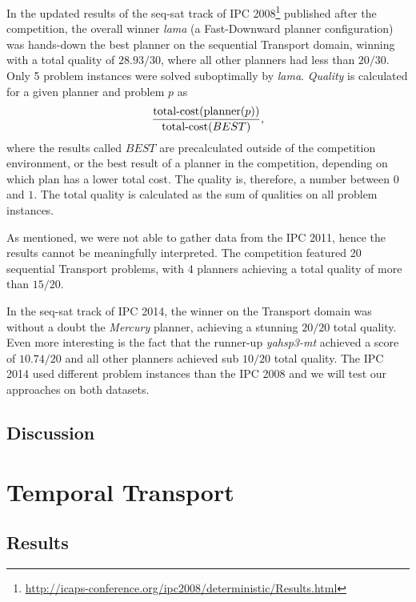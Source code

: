 In the updated results of the seq-sat track of IPC 2008\footnote{\url{http://icaps-conference.org/ipc2008/deterministic/Results.html}} published after the competition,
the overall winner \textit{lama} (a Fast-Downward  planner configuration)
was hands-down the best planner on the sequential Transport domain, winning
with a total quality of $28.93/30$, where all other planners had less than $20/30$.
Only 5 problem instances were solved suboptimally by \textit{lama}.
\textit{Quality} is calculated for a given planner and problem $p$
as $$\frac{\textrm{total-cost}(\textrm{planner}(p))}{\textrm{total-cost}(BEST)},$$ where the results called $BEST$
are precalculated outside of the competition environment, or the best result of a planner in the competition, depending on which plan has a lower total cost. The quality is, therefore, a number between $0$ and $1$. The total quality is calculated as the sum of qualities on all problem instances.

As mentioned, we were not able to gather data from the IPC 2011,
hence the results cannot be meaningfully interpreted.
The competition featured 20 sequential Transport problems,
with 4 planners achieving a total quality of more than $15/20$.

In the seq-sat track of IPC 2014, the winner on the Transport domain
was without a doubt the \textit{Mercury} planner, achieving
a stunning $20/20$ total quality. Even more interesting is the fact that
the runner-up \textit{yahsp3-mt} achieved a score of $10.74/20$
and all other planners achieved sub $10/20$ total quality.
The IPC 2014 used different problem instances than the IPC 2008
and we will test our approaches on both datasets.





\subsection{Discussion}

\section{Temporal Transport}

\subsection{Results}

